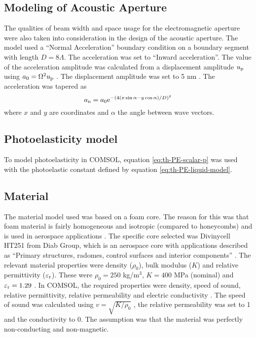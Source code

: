 \documentclass[11pt,twoside]{eitExjobb}
\begin{document}
	\subsection{Modeling of Acoustic Aperture}
	The qualities of beam width and space usage for the electromagnetic aperture were also taken into consideration in the design of the acoustic aperture. The model used a ``Normal Acceleration'' boundary condition on a boundary segment with length $D = 8\Lambda$. The acceleration was set to ``Inward acceleration''. The value of the acceleration amplitude was calculated from a displacement amplitude $u_{\mathrm{p}}$ using $a_0 = \Omega^2 u_{\mathrm{p}}$ \addref. The displacement amplitude was set to 5 nm . The acceleration was tapered as
	\begin{equation*}
		a_{\mathrm{n}} = a_0 \mathrm{e}^{-(4(x\sin{\alpha} - y\cos{\alpha})/D)^2}
	\end{equation*}
	where $x$ and $y$ are coordinates and $\alpha$ the angle between wave vectors.
	
	\subsection{Photoelasticity model}
	To model photoelasticity in COMSOL, equation \eqref{eq:th-PE-scalar-p} was used with the photoelastic constant defined by equation \eqref{eq:th-PE-liquid-model}.
	
	\subsection{Material}
	The material model used was based on a foam core. The reason for this was that foam material is fairly homogeneous and isotropic (compared to honeycombs) and is used in aerospace applications \addref. The specific core selected was Divinycell HT251 from Diab Group, which is an aerospace core with applications described as ``Primary structures, radomes, control surfaces and interior components'' \cite{Diab2016}. The relevant material properties were density ($\rho_0$), bulk modulus ($K$) and relative permittivity ($\varepsilon_{\mathrm{r}}$). These were $\rho_0 = 250$ kg/m$^3$, $K = 400$ MPa (nominal) and $\varepsilon_{\mathrm{r}} = 1.29$ \cite{Diab2016}. In COMSOL, the required properties were density, speed of sound, relative permittivity, relative permeability and electric conductivity . The speed of sound was calculated using $v = \sqrt{K/\rho_0}$ , the relative permeability was set to 1 and the conductivity to 0. The assumption was that the material was perfectly non-conducting and non-magnetic.
	
\end{document}
